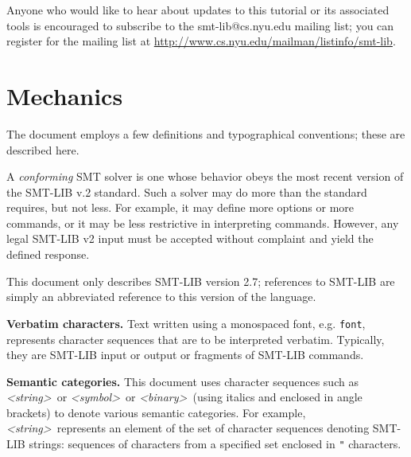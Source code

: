 \documentclass[12pt,oneside]{report}
\newcommand{\version}{2.7}
\newcommand{\sym}{{\it <symbol>}}
\newcommand{\binary}{{\it <binary>}}
\newcommand{\strng}{{\it <string>}} %
\begin{document}
Anyone who would like to hear about updates to this tutorial or its associated tools is encouraged to 
subscribe to the smt-lib@cs.nyu.edu mailing list; you can register for the mailing list at 
\url{http://www.cs.nyu.edu/mailman/listinfo/smt-lib}.

\section{Mechanics}

The document employs a few definitions and typographical conventions; these are described here.

A {\em conforming} SMT solver is one whose behavior obeys the most recent version of the SMT-LIB v.2 standard.  Such a solver may do more than the standard requires, but not less.  For example, it may define more options or more commands, or it may be less restrictive in interpreting commands.  However, any legal SMT-LIB v2 input must be accepted without complaint and yield the defined response.

This document only describes SMT-LIB version \version; references to SMT-LIB are simply an abbreviated reference to this version of the language.

{\bf Verbatim characters.} Text written using a monospaced font, e.g. {\tt font}, represents character sequences that are to be interpreted verbatim. Typically, they are SMT-LIB input or output or fragments of SMT-LIB commands.

{\bf Semantic categories.} This document uses character sequences such as \strng~or \sym~or \binary~(using italics and enclosed in angle brackets) to denote various semantic categories.  For example, \strng~represents an element of the set of character sequences denoting SMT-LIB strings: sequences of characters from a specified set enclosed in \verb|"| characters.
\end{document}
